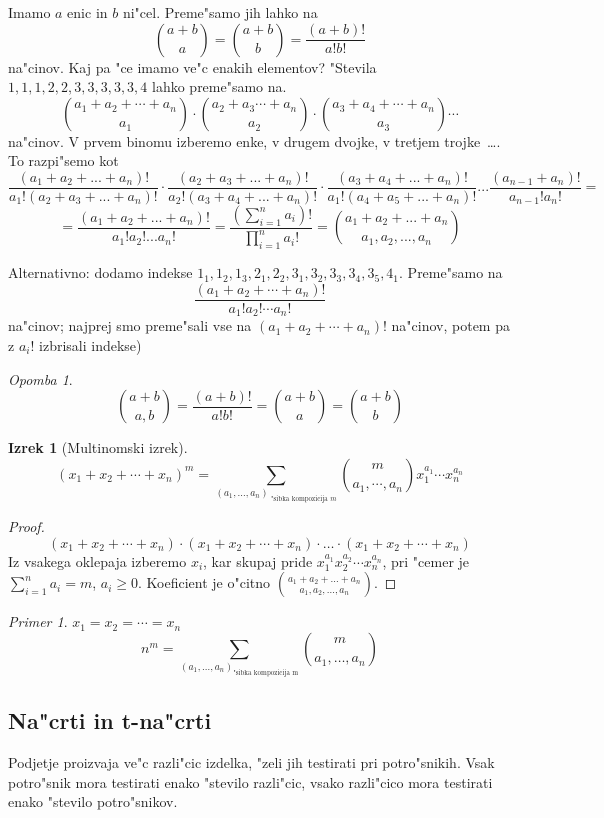 \documentclass[a4paper,12pt]{article}
\theoremstyle{definition}
\newtheorem{theorem}[counter]{Izrek}
\theoremstyle{remark}
\newtheorem*{ex}{Primer}
\newtheorem*{rem}{Opomba}
\begin{document}
Imamo $a$ enic in $b$ ni"cel. Preme"samo jih lahko na
\[\binom{a + b}{a} = \binom{a + b}{b} = \frac{(a+b)!}{a!b!}\]
na"cinov. Kaj pa "ce imamo ve"c enakih elementov? "Stevila $1,1,1,2,2,3,3,3,3,3,4$ lahko preme"samo na.
\[\binom{a_1 + a_2 + \cdots + a_n}{a_1} \cdot \binom{a_2 + a_3 \cdots + a_n}{a_2} \cdot \binom{a_3 + a_4 + \cdots + a_n}{a_3} \cdots\]
na"cinov. V prvem binomu izberemo enke, v drugem dvojke, v tretjem trojke~\ldots. To razpi"semo kot
\[\frac{(a_1 + a_2 + ... + a_n)!}{a_1!(a_2 + a_3 + ... + a_n)!} \cdot \frac{(a_2 + a_3 + ... + a_n)!}{a_2!(a_3 + a_4 + ... + a_n)!} \cdot \frac{(a_3 + a_4 + ... + a_n)!}{a_1!(a_4 + a_5 + ... + a_n)!} ... \frac{(a_{n-1}+a_n)!}{a_{n-1}!a_n!} =\]
\[= \frac{(a_1 + a_2 + ... + a_n)!}{a_1!a_2!...a_n!} = \frac{(\displaystyle \sum_{i = 1}^n a_i)!}{\displaystyle \prod_{i = 1}^n a_i!} = \binom{a_1 + a_2 + ... + a_n}{a_1, a_2, ..., a_n}\]

Alternativno: dodamo indekse $1_1, 1_2, 1_3, 2_1, 2_2, 3_1, 3_2, 3_3, 3_4, 3_5, 4_1$. Preme"samo na
\[\frac{(a_1 + a_2 + \cdots + a_n)!}{a_1!a_2! \cdots a_n!}\]
na"cinov; najprej smo preme"sali vse na $(a_1 + a_2 + \cdots + a_n)!$ na"cinov, potem pa z $a_i!$ izbrisali indekse)

\begin{rem}
	\[\binom{a+b}{a, b} = \frac{(a+b)!}{a!b!} = \binom{a+b}{a} = \binom{a+b}{b}\]
\end{rem}

\begin{theorem}[Multinomski izrek]
	\[(x_1 + x_2 + \cdots + x_n)^m = \sum_{(a_1, \ldots, a_n)_{\text{ "sibka kompozicija }m}} \binom{m}{a_1, \cdots, a_n} x_1^{a_1}\cdots x_n^{a_n}\]
\end{theorem}

\begin{proof}
	\[(x_1 + x_2 + \cdots + x_n)\cdot(x_1 + x_2 + \cdots + x_n)\cdot\ldots\cdot(x_1 + x_2 + \cdots + x_n)\]
	Iz vsakega oklepaja izberemo $x_i$, kar skupaj pride $x_1^{a_1} x_2^{a_2}\cdots x_n^{a_n}$, pri "cemer je $\displaystyle \sum_{i = 1}^n a_i = m$, $a_i \geqslant 0$. Koeficient je o"citno $\binom{a_1 + a_2 + \ldots + a_n}{a_1, a_2, \ldots, a_n}$.
\end{proof}

\begin{ex}
	$x_1 = x_2 = \cdots = x_n$
	\[n^m = \sum_{(a_1, \ldots, a_n)_{\text{"sibka kompozicija m}}} \binom{m}{a_1, \ldots, a_n}\]
\end{ex}


\subsection{Na"crti in t-na"crti}
Podjetje proizvaja ve"c razli"cic izdelka, "zeli jih testirati pri potro"snikih. Vsak potro"snik mora testirati enako "stevilo razli"cic, vsako razli"cico mora testirati enako "stevilo potro"snikov.
\end{document}
